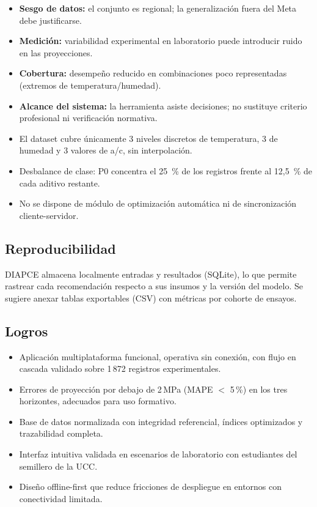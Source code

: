 \documentclass[12pt, letterpaper]{article}
\begin{document}
\begin{itemize}
  \item \textbf{Sesgo de datos:} el conjunto es regional; la generalización fuera del Meta debe justificarse.
  \item \textbf{Medición:} variabilidad experimental en laboratorio puede introducir ruido en las proyecciones.
  \item \textbf{Cobertura:} desempeño reducido en combinaciones poco representadas (extremos de temperatura/humedad).
  \item \textbf{Alcance del sistema:} la herramienta asiste decisiones; no sustituye criterio profesional ni verificación normativa.
  \item El dataset cubre únicamente 3 niveles discretos de temperatura, 3 de humedad y 3 valores de a/c, sin interpolación.
  \item Desbalance de clase: P0 concentra el 25~\% de los registros frente al 12{,}5~\% de cada aditivo restante.
  \item No se dispone de módulo de optimización automática ni de sincronización cliente-servidor.
\end{itemize}

\subsection{Reproducibilidad}

DIAPCE almacena localmente entradas y resultados (SQLite), lo que permite rastrear cada recomendación respecto a sus insumos y la versión del modelo. Se sugiere anexar tablas exportables (CSV) con métricas por cohorte de ensayos.

\subsection{Logros}

\begin{itemize}
  \item Aplicación multiplataforma funcional, operativa sin conexión, con flujo en cascada validado sobre 1\,872 registros experimentales.
  \item Errores de proyección por debajo de 2\,MPa (MAPE $<$ 5\,\%) en los tres horizontes, adecuados para uso formativo.
  \item Base de datos normalizada con integridad referencial, índices optimizados y trazabilidad completa.
  \item Interfaz intuitiva validada en escenarios de laboratorio con estudiantes del semillero de la UCC.
  \item Diseño offline-first que reduce fricciones de despliegue en entornos con conectividad limitada.
\end{itemize}
\end{document}
